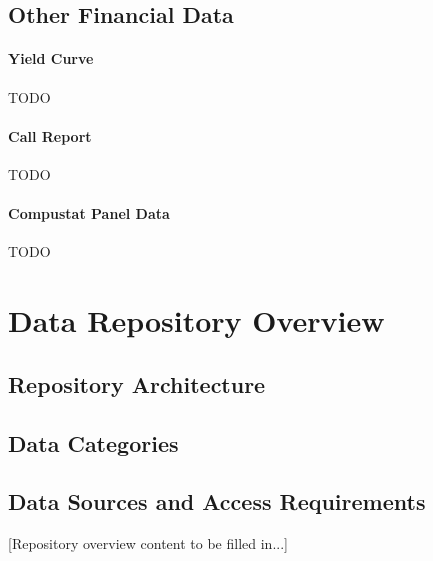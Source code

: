 \documentclass{article}
\begin{document}
\subsection{Other Financial Data}

\paragraph{Yield Curve}
TODO

\paragraph{Call Report}
TODO

\paragraph{Compustat Panel Data}
TODO




\section{Data Repository Overview}
\label{sec:repository_overview}


\subsection{Repository Architecture}

\subsection{Data Categories}

\subsection{Data Sources and Access Requirements}

[Repository overview content to be filled in...]
\end{document}
